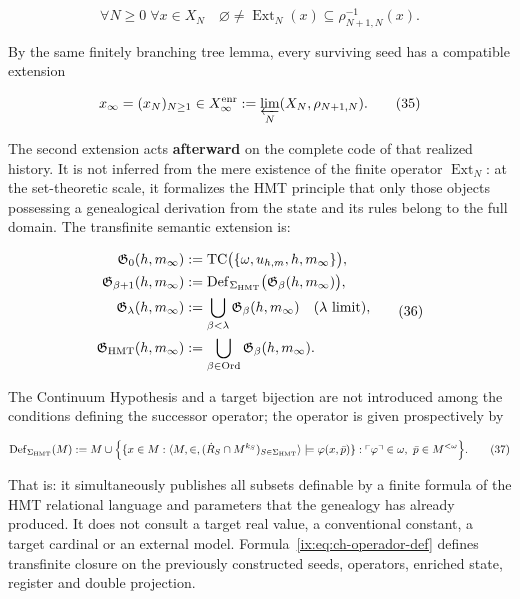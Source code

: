 \[
 \forall N\ge0\;\forall x\in X_N\quad
 \varnothing\ne\operatorname{Ext}_N(x)
 \subseteq\rho_{N+1,N}^{-1}(x).
\tag{34}\label{ix:eq:ch-extension-no-vacia}
\]

By the same finitely branching tree lemma, every surviving seed has a
compatible extension

\[
 x_\infty=(x_N)_{N\ge1}\in
 X_\infty^{\rm enr}:=\varprojlim_N(X_N,\rho_{N+1,N}).
\tag{35}\label{ix:eq:ch-limite-inverso}
\]

The second extension acts \textbf{afterward} on the complete code of that
realized history.
It is not inferred from the mere existence of the finite operator
\(\operatorname{Ext}_N\): at the set-theoretic scale, it formalizes the HMT principle that
only those objects possessing a genealogical derivation
from the state and its rules belong to the full domain. The transfinite semantic
extension is:

\[
 \begin{aligned}
  \mathfrak G_0(h,m_\infty)
  &:=\operatorname{TC}\bigl(\{\omega,u_{h,m},h,m_\infty\}\bigr),\\
  \mathfrak G_{\beta+1}(h,m_\infty)
  &:=\operatorname{Def}_{\Sigma_{\rm HMT}}
       \bigl(\mathfrak G_\beta(h,m_\infty)\bigr),\\
  \mathfrak G_\lambda(h,m_\infty)
  &:=\bigcup_{\beta<\lambda}\mathfrak G_\beta(h,m_\infty)
       \quad(\lambda\text{ limit}),\\
  \mathfrak G_{\rm HMT}(h,m_\infty)
  &:=\bigcup_{\beta\in\operatorname{Ord}}
       \mathfrak G_\beta(h,m_\infty).
 \end{aligned}
\tag{36}\label{ix:eq:ch-clausura-transfinita}
\]

The Continuum Hypothesis and a target bijection are not introduced among the
conditions defining the successor operator; the operator is given
prospectively by

\[
 \operatorname{Def}_{\Sigma_{\rm HMT}}(M)
 :=M\cup
 \Bigl\{
   \{x\in M:\langle M,\in,
       (\dot R_S\cap M^{k_S})_{S\in\Sigma_{\rm HMT}}\rangle
       \models\varphi(x,\bar p)\}:
   \ulcorner\varphi\urcorner\in\omega,
   \ \bar p\in M^{<\omega}
 \Bigr\}.
\tag{37}\label{ix:eq:ch-operador-def}
\]

That is: it simultaneously publishes all subsets definable by a
finite formula of the HMT relational language and parameters that the genealogy has already
produced. It does not
consult a target real value, a conventional constant, a target cardinal
or an external model. Formula~\eqref{ix:eq:ch-operador-def} defines transfinite closure
on the previously constructed seeds, operators, enriched state, register and
double projection.

